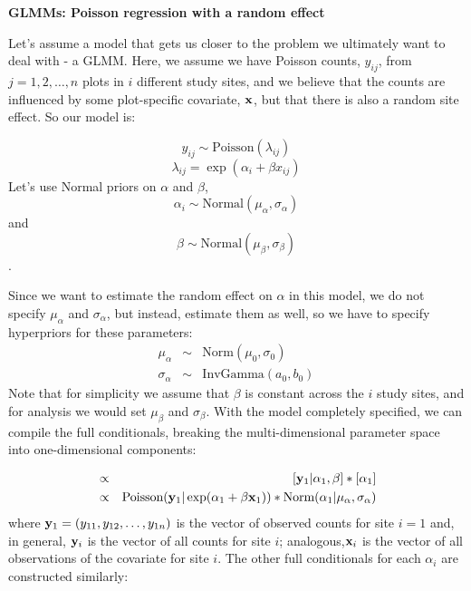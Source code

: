 {\flushleft \bf  GLMMs: Poisson regression with a random effect }

Let's assume a model that gets us closer to the problem we ultimately
want to deal with - a GLMM. Here, we assume we have Poisson counts,
$y_{ij}$, from $j=1,2,\ldots,n$ plots in $i$ different study sites,
and we believe that the counts are influenced by some plot-specific
covariate, ${\bf x}$, but that there is also a random site effect. So
our model is:

  
\[
y_{ij} \sim \mbox{Poisson}(\lambda_{ij})
\]
\[
\lambda_{ij} = \exp (\alpha_i + \beta x_{ij})
\]
Let's use Normal priors on $\alpha$ and $\beta$,  \[
\alpha_i \sim \mbox{Normal} (\mu_{\alpha}, \sigma_{\alpha})
\]
and
\[
\beta \sim \mbox{Normal} (\mu_{\beta}, \sigma_{\beta})
\].

Since we want to estimate the random effect on $\alpha$ in this model, we do not
specify $\mu_{\alpha}$ and $\sigma_{\alpha}$, but instead, estimate them as well, so we have
to specify hyperpriors for these parameters:
\begin{eqnarray*}
\mu_{\alpha}  &\sim &  \mbox{Norm}(\mu_0, \sigma_0)  \\
\sigma_{\alpha} & \sim & \mbox{InvGamma}(a_0, b_0)
\end{eqnarray*}
Note that for simplicity we assume that $\beta$ is constant across the $i$ study sites, and for analysis we would set $\mu_{\beta}$ and $\sigma_{\beta}$.
With the model completely specified, we can compile the full conditionals,
breaking the multi-dimensional parameter space into one-dimensional
components:

\begin{eqnarray*}
[\alpha_1|\alpha_2,\alpha_3,\ldots,\alpha_i,\beta,{\bf y}_{1}] & \propto &   [{\bf y}_{1}|\alpha_1,\beta] * [\alpha_1] \\
	 & \propto  &   \mbox{Poisson}({\bf y}_{1}| \exp(\alpha_1 + \beta {\bf x}_1)) * \mbox{Norm}(\alpha_1|\mu_{\alpha} , \sigma_{\alpha})
\end{eqnarray*}
where ${\bf y}_{1} = (y_{11},y_{12}, \ldots, y_{1n})$ is the vector of
observed counts for site $i=1$ and, in general, ${\bf y}_{i}$ is the
vector of all counts for site $i$; analogous,${\bf x}_{i}$ is the
vector of all observations of the covariate for site $i$. The other full conditionals for
each $\alpha_{i}$ are constructed similarly:


